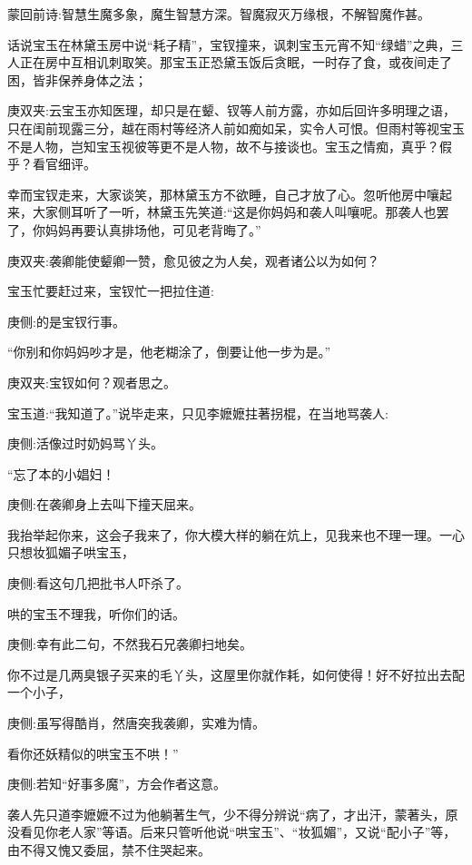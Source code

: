 
\begin{parag}
    \begin{note}蒙回前诗:智慧生魔多象，魔生智慧方深。智魔寂灭万缘根，不解智魔作甚。\end{note}
\end{parag}


\begin{parag}
    话说宝玉在林黛玉房中说“耗子精”，宝钗撞来，讽刺宝玉元宵不知“绿蜡”之典，三人正在房中互相讥刺取笑。那宝玉正恐黛玉饭后贪眠，一时存了食，或夜间走了困，皆非保养身体之法；\begin{note}庚双夹:云宝玉亦知医理，却只是在颦、钗等人前方露，亦如后回许多明理之语，只在闺前现露三分，越在雨村等经济人前如痴如呆，实令人可恨。但雨村等视宝玉不是人物，岂知宝玉视彼等更不是人物，故不与接谈也。宝玉之情痴，真乎？假乎？看官细评。\end{note}幸而宝钗走来，大家谈笑，那林黛玉方不欲睡，自己才放了心。忽听他房中嚷起来，大家侧耳听了一听，林黛玉先笑道:“这是你妈妈和袭人叫嚷呢。那袭人也罢了，你妈妈再要认真排场他，可见老背晦了。”\begin{note}庚双夹:袭卿能使颦卿一赞，愈见彼之为人矣，观者诸公以为如何？\end{note}
\end{parag}


\begin{parag}
    宝玉忙要赶过来，宝钗忙一把拉住道:\begin{note}庚侧:的是宝钗行事。\end{note}“你别和你妈妈吵才是，他老糊涂了，倒要让他一步为是。”\begin{note}庚双夹:宝钗如何？观者思之。\end{note}宝玉道:“我知道了。”说毕走来，只见李嬷嬷拄著拐棍，在当地骂袭人:\begin{note}庚侧:活像过时奶妈骂丫头。\end{note}“忘了本的小娼妇！\begin{note}庚侧:在袭卿身上去叫下撞天屈来。\end{note}我抬举起你来，这会子我来了，你大模大样的躺在炕上，见我来也不理一理。一心只想妆狐媚子哄宝玉，\begin{note}庚侧:看这句几把批书人吓杀了。\end{note}哄的宝玉不理我，听你们的话。\begin{note}庚侧:幸有此二句，不然我石兄袭卿扫地矣。\end{note}你不过是几两臭银子买来的毛丫头，这屋里你就作耗，如何使得！好不好拉出去配一个小子，\begin{note}庚侧:虽写得酷肖，然唐突我袭卿，实难为情。\end{note}看你还妖精似的哄宝玉不哄！”\begin{note}庚侧:若知“好事多魔”，方会作者这意。\end{note}袭人先只道李嬷嬷不过为他躺著生气，少不得分辨说“病了，才出汗，蒙著头，原没看见你老人家”等语。后来只管听他说“哄宝玉”、“妆狐媚”，又说“配小子”等，由不得又愧又委屈，禁不住哭起来。
\end{parag}


